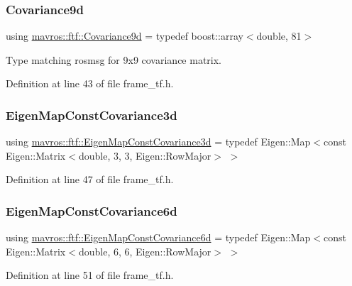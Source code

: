 \subsubsection{\texorpdfstring{Covariance9d}{Covariance9d}}
{\footnotesize\ttfamily using \mbox{\hyperlink{group__nodelib_ga6df3c37d3cd74b3e6919e734575bb9b7}{mavros\+::ftf\+::\+Covariance9d}} = typedef boost\+::array$<$double, 81$>$}



Type matching rosmsg for 9x9 covariance matrix. 



Definition at line 43 of file frame\+\_\+tf.\+h.

\mbox{\label{group__nodelib_ga05212907ea66649136fdbe0ecea29224}} 
\subsubsection{\texorpdfstring{EigenMapConstCovariance3d}{EigenMapConstCovariance3d}}
{\footnotesize\ttfamily using \mbox{\hyperlink{group__nodelib_ga05212907ea66649136fdbe0ecea29224}{mavros\+::ftf\+::\+Eigen\+Map\+Const\+Covariance3d}} = typedef Eigen\+::\+Map$<$const Eigen\+::\+Matrix$<$double, 3, 3, Eigen\+::\+Row\+Major$>$ $>$}



Definition at line 47 of file frame\+\_\+tf.\+h.

\mbox{\label{group__nodelib_ga5e718b36aa6575dc90187729b5c96f4c}} 
\subsubsection{\texorpdfstring{EigenMapConstCovariance6d}{EigenMapConstCovariance6d}}
{\footnotesize\ttfamily using \mbox{\hyperlink{group__nodelib_ga5e718b36aa6575dc90187729b5c96f4c}{mavros\+::ftf\+::\+Eigen\+Map\+Const\+Covariance6d}} = typedef Eigen\+::\+Map$<$const Eigen\+::\+Matrix$<$double, 6, 6, Eigen\+::\+Row\+Major$>$ $>$}



Definition at line 51 of file frame\+\_\+tf.\+h.

